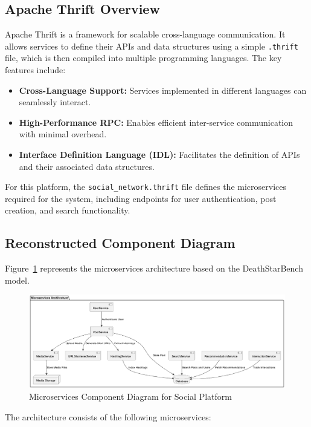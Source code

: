 \documentclass[a4paper,12pt]{article}
\begin{document}
\subsection{Apache Thrift Overview}

Apache Thrift is a framework for scalable cross-language communication. It allows services to define their APIs and data structures using a simple \texttt{.thrift} file, which is then compiled into multiple programming languages. The key features include:
\begin{itemize}
    \item \textbf{Cross-Language Support:} Services implemented in different languages can seamlessly interact.
    \item \textbf{High-Performance RPC:} Enables efficient inter-service communication with minimal overhead.
    \item \textbf{Interface Definition Language (IDL):} Facilitates the definition of APIs and their associated data structures.
\end{itemize}

For this platform, the \texttt{social\_network.thrift} file defines the microservices required for the system, including endpoints for user authentication, post creation, and search functionality.

\subsection{Reconstructed Component Diagram}

Figure~\ref{fig:microservice-components} represents the microservices architecture based on the DeathStarBench model.

\begin{figure}[H]
    \centering
    \includegraphics[width=1\linewidth]{microservice-component.png}
    \caption{Microservices Component Diagram for Social Platform}
    \label{fig:microservice-components}
\end{figure}

The architecture consists of the following microservices:
\end{document}
